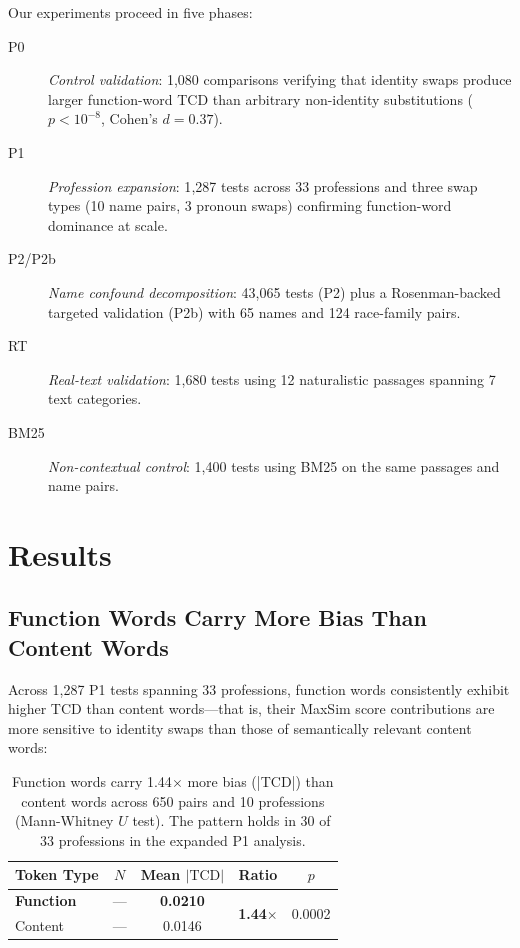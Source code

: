 \documentclass[sigconf,review,anonymous]{acmart}
\newcommand{\tcd}{\text{TCD}}
\begin{document}
Our experiments proceed in five phases:

\begin{description}
\item[P0] \emph{Control validation}: 1{,}080 comparisons verifying that identity swaps produce larger function-word TCD than arbitrary non-identity substitutions ($p < 10^{-8}$, Cohen's $d = 0.37$).

\item[P1] \emph{Profession expansion}: 1{,}287 tests across 33 professions and three swap types (10 name pairs, 3 pronoun swaps) confirming function-word dominance at scale.

\item[P2/P2b] \emph{Name confound decomposition}: 43{,}065 tests (P2) plus a Rosenman-backed targeted validation (P2b) with 65 names and 124 race-family pairs.

\item[RT] \emph{Real-text validation}: 1{,}680 tests using 12 naturalistic passages spanning 7 text categories.

\item[BM25] \emph{Non-contextual control}: 1{,}400 tests using BM25 on the same passages and name pairs.
\end{description}


\section{Results}
\label{sec:results}

\subsection{Function Words Carry More Bias Than Content Words}
\label{sec:results:funcword}

Across 1{,}287 P1 tests spanning 33 professions, function words consistently exhibit higher TCD than content words---that is, their MaxSim score contributions are more sensitive to identity swaps than those of semantically relevant content words:

\begin{table}[t]
\centering
\small
\begin{tabular}{lcccc}
\toprule
Token Type & $N$ & Mean $|\tcd|$ & Ratio & $p$ \\
\midrule
\textbf{Function} & --- & \textbf{0.0210} & \multirow{2}{*}{\textbf{1.44$\times$}} & \multirow{2}{*}{0.0002} \\
Content            & --- & 0.0146           &                                         & \\
\bottomrule
\end{tabular}
\caption{Function words carry 1.44$\times$ more bias (|TCD|) than content words across 650 pairs and 10 professions (Mann-Whitney $U$ test). The pattern holds in 30 of 33 professions in the expanded P1 analysis.}
\label{tab:func_vs_cont}
\end{table}
\end{document}

